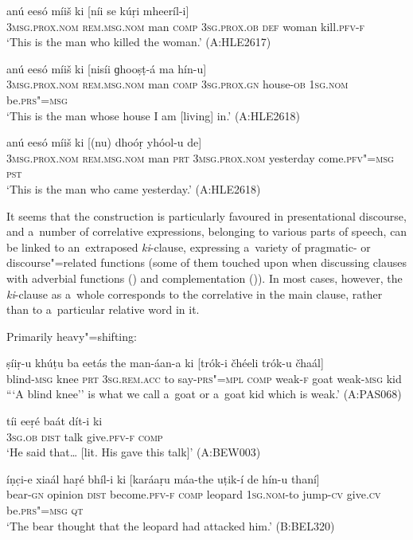 \begin{exe}
\ex
\label{ex:13-225}
\gll anú eesó míiš ki [níi  se kúṛi mheeríl-i] \\
\textsc{3msg.prox.nom} \textsc{rem.msg.nom} man \textsc{comp} \textsc{3sg.prox.ob} \textsc{def} woman kill.\textsc{pfv-f} \\
\glt `This is the man who killed the woman.' (A:HLE2617)

\ex
\label{ex:13-226}
\gll anú eesó míiš ki [nisíi  ɡhooṣṭ-á ma hín-u] \\
\textsc{3msg.prox.nom} \textsc{rem.msg.nom} man \textsc{comp} \textsc{3sg.prox.gn} house-\textsc{ob} \textsc{1sg.nom} be.\textsc{prs"=msg} \\
\glt `This is the man whose house I am [living] in.' (A:HLE2618)

\ex
\label{ex:13-227}
\gll anú eesó míiš ki [(nu)  dhoóṛ yhóol-u de] \\
\textsc{3msg.prox.nom} \textsc{rem.msg.nom} man \textsc{prt} \textsc{3msg.prox.nom} yesterday come.\textsc{pfv"=msg} \textsc{pst} \\
\glt `This is the man who came yesterday.' (A:HLE2618) 
\end{exe}

It seems that the construction is particularly favoured in presentational discourse, and a~number of correlative expressions, belonging to various parts of speech, can be linked to an~extraposed \textit{ki}-clause, expressing a~variety of pragmatic- or discourse"=related functions (some of them touched upon when discussing clauses with adverbial functions () and complementation ()). In most cases, however, the \textit{ki}-clause as a~whole corresponds to the correlative in the main clause, rather than to a~particular relative word in it.

\clearpage
{} Primarily heavy"=shifting:

\begin{exe}
\ex
\label{ex:13-228}
\gll ṣíiṛ-u khúṭu ba eetás the  man-áan-a ki [trók-i čhéeli trók-u čhaál] \\
blind-\textsc{msg} knee \textsc{prt} \textsc{3sg.rem.acc} to say-\textsc{prs"=mpl} \textsc{comp} weak-\textsc{f} goat weak-\textsc{msg} kid \\
\glt ```A blind knee'' is what we call a~goat or a~goat kid which is weak.' (A:PAS068)

\ex
\label{ex:13-229}
\gll tíi eeṛé baát dít-i ki  \\
\textsc{3sg.ob} \textsc{dist} talk give.\textsc{pfv-f} \textsc{comp}  \\
\glt `He said that{\ldots} [lit. His gave this talk]' (A:BEW003)

\ex
\label{ex:13-230}
\gll íṇc̣i-e xiaál haṛé bhíl-i  ki [karáaṛu máa-the uṭik-í de hín-u thaní] \\
bear-\textsc{gn} opinion \textsc{dist} become.\textsc{pfv-f} \textsc{comp} leopard \textsc{1sg.nom-}to jump-\textsc{cv} give.\textsc{cv} be.\textsc{prs"=msg} \textsc{qt} \\
\glt `The bear thought that the leopard had attacked him.' (B:BEL320) 
\end{exe}

